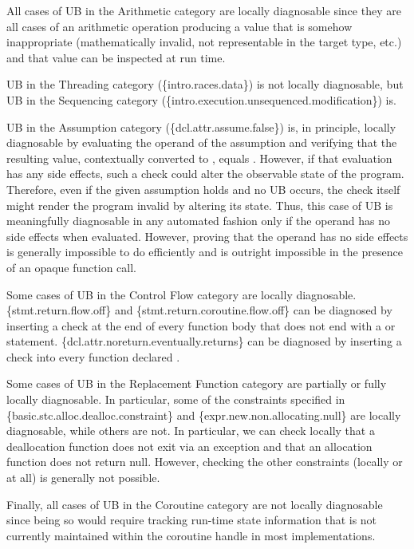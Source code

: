 All cases of UB in the Arithmetic category are locally diagnosable since they are all cases of an arithmetic operation producing a value that is somehow inappropriate (mathematically invalid, not representable in the target type, etc.) and that value can be inspected at run time.

UB in the Threading category (\{intro.races.data\}) is not locally diagnosable, but UB in the Sequencing category (\{intro.execution.unsequenced.modification\}) is. 

UB in the Assumption category (\{dcl.attr.assume.false\}) is, in principle, locally diagnosable by evaluating the operand of the assumption and verifying that the resulting value, contextually converted to , equals . However, if that evaluation has any side effects, such a check could alter the observable state of the program. Therefore, even if the given assumption holds and no UB occurs, the check itself might render the program invalid by altering its state. Thus, this case of UB is  meaningfully diagnosable in any automated fashion only if the operand has no side effects when evaluated. However, proving that the operand has no side effects is generally impossible to do efficiently and is outright impossible in the presence of an opaque function call.

Some cases of UB in the Control Flow category are locally diagnosable. \{stmt.return.flow.off\} and \{stmt.return.coroutine.flow.off\} can be diagnosed by inserting a check at the end of every function body that does not end with a  or  statement. \{dcl.attr.noreturn.eventually.returns\} can be diagnosed by inserting a check into every function declared \tcode{[[noreturn]]}.

Some cases of UB in the Replacement Function category are partially or fully locally diagnosable. In particular, some of the constraints specified in \{basic.stc.alloc.dealloc.constraint\} and \{expr.new.non.allocating.null\} are locally diagnosable, while others are not. In particular, we can check locally that a deallocation function does not exit via an exception and that an allocation function does not return null. However, checking the other constraints (locally or at all) is generally not possible.

Finally, all cases of UB in the Coroutine category are not locally diagnosable since being so would require tracking run-time state information that is not currently maintained within the coroutine handle in most implementations.

